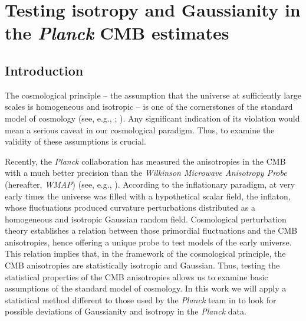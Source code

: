 \chapter{Testing isotropy and Gaussianity in the \textit{Planck} CMB estimates}
\label{chapter-vsk}

\section{Introduction} 

The cosmological principle -- the assumption that the universe at sufficiently large scales is homogeneous and isotropic -- is one of the cornerstones of the standard model of cosmology (see, e.g., \cite{Robertson1935}; \cite{Walker1937}). Any significant indication of its violation would mean a serious caveat in our cosmological paradigm. Thus, to examine the validity of these assumptions is crucial. 

Recently, the \textit{Planck} collaboration has measured the anisotropies in the CMB with a much better precision than the \textit{Wilkinson Microwave Anisotropy Probe} (hereafter, \textit{WMAP}) (see, e.g., \cite{Spergel2003b}). According to the inflationary paradigm, at very early times the universe was filled with a hypothetical scalar field, the inflaton, whose fluctuations produced curvature perturbations distributed as a homogeneous and isotropic Gaussian random field. Cosmological perturbation theory establishes a relation between those primordial fluctuations and the CMB anisotropies, hence offering a unique probe to test models of the early universe. This relation implies that, in the framework of the cosmological principle, the CMB anisotropies are  statistically isotropic and Gaussian. Thus, testing the statistical properties of the CMB anisotropies allows us to examine  basic assumptions of the standard model of cosmology. In this work we will apply a statistical method different to those used by the \textit{Planck} team in \cite{PlanckXXIII} to look for possible deviations of Gaussianity and isotropy in the \textit{Planck} data.


